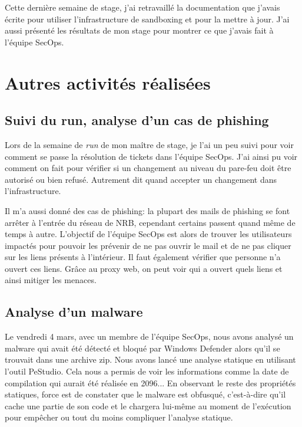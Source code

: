 Cette dernière semaine de stage, j'ai retravaillé la documentation que j'avais écrite pour utiliser l'infrastructure de sandboxing et pour la mettre à jour. J'ai aussi présenté les résultats de mon stage pour montrer ce que j'avais fait à l'équipe SecOps.





\section{Autres activités réalisées}



\subsection{Suivi du run, analyse d'un cas de phishing}

Lors de la semaine de \textit{run} de mon maître de stage, je l'ai un peu suivi pour voir comment se passe la résolution de tickets dans l'équipe SecOps. J'ai ainsi pu voir comment on fait pour vérifier si un changement au niveau du pare-feu doit être autorisé ou bien refusé. Autrement dit quand accepter un changement dans l'infrastructure.

Il m'a aussi donné des cas de phishing: la plupart des mails de phishing se font arrêter à l'entrée du réseau de NRB, cependant certains passent quand même de temps à autre. L'objectif de l'équipe SecOps est alors de trouver les utilisateurs impactés pour pouvoir les prévenir de ne pas ouvrir le mail et de ne pas cliquer sur les liens présents à l'intérieur. Il faut également vérifier que personne n'a ouvert ces liens. Grâce au proxy web, on peut voir qui a ouvert quels liens et ainsi mitiger les menaces.



\subsection{Analyse d'un malware}

Le vendredi 4 mars, avec un membre de l'équipe SecOps, nous avons analysé un malware qui avait été détecté et bloqué par Windows Defender alors qu'il se trouvait dans une archive zip. Nous avons lancé une analyse statique en utilisant l'outil PeStudio. Cela nous a permis de voir les informations comme la date de compilation qui aurait été réalisée en 2096... En observant le reste des propriétés statiques, force est de constater que le malware est obfusqué, c'est-à-dire qu'il cache une partie de son code et le chargera lui-même au moment de l'exécution pour empêcher ou tout du moins compliquer l'analyse statique.

